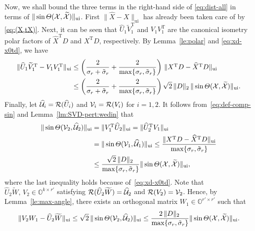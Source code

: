 \documentclass[11pt]{article}
\def\bbO{\mathbb{O}}
\def\cR{{\cal R}}
\def\cU{{\cal U}}
\def\cV{{\cal V}}
\def\cX{{\cal X}}
\DeclareMathOperator{\ui}{ui}
\DeclareMathOperator{\T}{T}
\DeclareMathOperator{\UI}{ui}
\def\wtd{\widetilde}
\def\what{\widehat}
\theoremstyle{definition}
\numberwithin{equation}{section}
\numberwithin{figure}{section}
\numberwithin{table}{section}
\begin{document}
Now, we shall bound the three terms in the right-hand side of \eqref{eq:dist-all} in terms of
$\|\sin\Theta(\cX,\wtd\cX)\|_{\UI}$.
First $\|\what X- X\|_{\UI}$ has already been taken care of by \eqref{eq:(X,tX)}.
Next, it can be seen that $\what U_1\wtd V_1^{\T}$ and $V_1V_1^{\T}$ are the canonical isometry polar factors of
$\what X^{\T}D$ and $X^{\T}D$, respectively.
By Lemma~\ref{le:polar} and \eqref{eq:xd-x0td}, we have
\begin{align}\label{eq:dist-1}
 \notag \|\what U_1\wtd V_1^{\T}-V_1V_1^{\T}\|_{\UI}&\le\left(\frac{2}{\sigma_r+\tilde\sigma_r}
 +\frac{2}{\max\{ \sigma_r,\tilde\sigma_r\}}\right)\,\|X^{\T}D-\what X^{\T}D\|_{\UI}\\
&\le \left(\frac{2}{\sigma_r+\tilde\sigma_r}+\frac{2}{\max\{\sigma_r,\tilde\sigma_r\}}\right)
  \sqrt 2\,\|D\|_2\,\|\sin\Theta(\cX,\wtd\cX)\|_{ \ui}.
\end{align}
Finally, let $\what\cU_i=\cR(\what U_i)$ and $\cV_i=\cR(V_i)$ for $i=1,2$.
It follows from~\eqref{eq:def-comp-sin} and Lemma~\ref{lm:SVD-pert:wedin} that
\begin{align}\label{eq:sinu2v2}
\notag \|\sin\Theta(\cV_2,\what\cU_2)\|_{\UI}&=\|V_1^{\T}\what U_2\|_{\UI}=\|\what U_2^{\T}V_1\|_{\UI}\\
\notag &=\|\sin\Theta(\cV_1,\what\cU_1)\|_{\UI}
         \le\frac{\|X^{\T}D-\what X^{\T}D\|_{\UI}}{\max\{ \sigma_r,\tilde\sigma_r\}} \\
&\le\frac{\sqrt 2\,\|D\|_2\,}{\max\{\sigma_r,\tilde\sigma_r\}}\|\sin\Theta(\cX,\wtd\cX)\|_{ \ui},
\end{align}
where the last inequality holds because of~\eqref{eq:xd-x0td}.
Note that $\what U_2\wtd W,\,V_2\in\bbO^{k\times r'}$ satisfying $\cR(\what U_2\wtd W)=\what\cU_2$ and $\cR(V_2)=\cV_2$.
Hence, by Lemma~\ref{le:max-angle},
there exists an orthogonal matrix $W_1\in\bbO^{r'\times r'}$ such that
\begin{equation} \label{eq:u2}
   \|V_2W_1-\what U_2\wtd W\|_{\UI}\le\sqrt 2\,\|\sin\Theta(\cV_2,\what\cU_2)\|_{ \ui}\le
   \frac{2\,\|D\|_2\,}{\max\{ \sigma_r,\tilde\sigma_r\}}\|\sin\Theta(\cX,\wtd\cX)\|_{ \ui}.
\end{equation}
\end{document}
